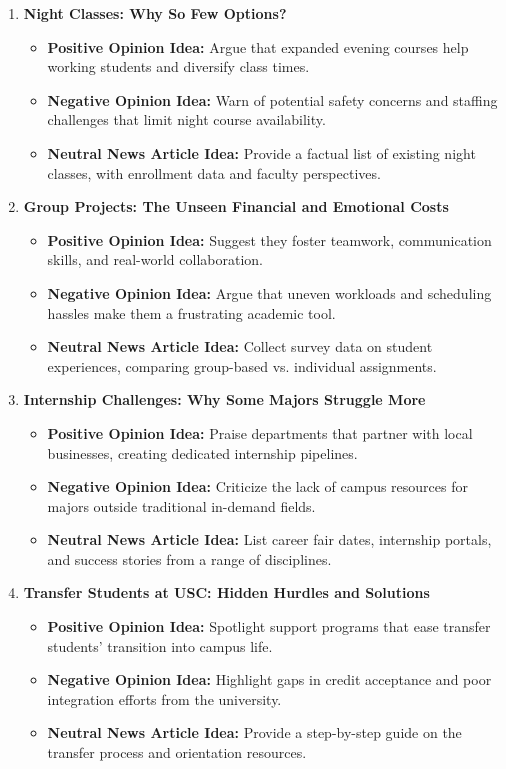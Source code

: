 \documentclass{article}
\begin{document}
\begin{enumerate}
    \item \textbf{Night Classes: Why So Few Options?}
    \begin{itemize}
        \item \textbf{Positive Opinion Idea:} Argue that expanded evening courses help working students and diversify class times.
        \item \textbf{Negative Opinion Idea:} Warn of potential safety concerns and staffing challenges that limit night course availability.
        \item \textbf{Neutral News Article Idea:} Provide a factual list of existing night classes, with enrollment data and faculty perspectives.
    \end{itemize}

    \item \textbf{Group Projects: The Unseen Financial and Emotional Costs}
    \begin{itemize}
        \item \textbf{Positive Opinion Idea:} Suggest they foster teamwork, communication skills, and real-world collaboration.
        \item \textbf{Negative Opinion Idea:} Argue that uneven workloads and scheduling hassles make them a frustrating academic tool.
        \item \textbf{Neutral News Article Idea:} Collect survey data on student experiences, comparing group-based vs. individual assignments.
    \end{itemize}

    \item \textbf{Internship Challenges: Why Some Majors Struggle More}
    \begin{itemize}
        \item \textbf{Positive Opinion Idea:} Praise departments that partner with local businesses, creating dedicated internship pipelines.
        \item \textbf{Negative Opinion Idea:} Criticize the lack of campus resources for majors outside traditional in-demand fields.
        \item \textbf{Neutral News Article Idea:} List career fair dates, internship portals, and success stories from a range of disciplines.
    \end{itemize}

    \item \textbf{Transfer Students at USC: Hidden Hurdles and Solutions}
    \begin{itemize}
        \item \textbf{Positive Opinion Idea:} Spotlight support programs that ease transfer students’ transition into campus life.
        \item \textbf{Negative Opinion Idea:} Highlight gaps in credit acceptance and poor integration efforts from the university.
        \item \textbf{Neutral News Article Idea:} Provide a step-by-step guide on the transfer process and orientation resources.
    \end{itemize}


\end{enumerate}
\end{document}
